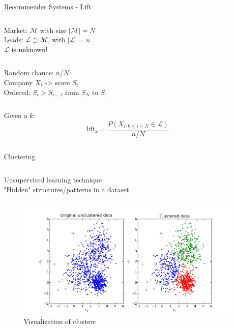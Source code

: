 \begin{frame}{Recommender Systems - Lift} \pause
    \begin{column}{.5\textwidth}
        Market: $\mathcal M$ with size $|\mathcal M |\!=\!N$ \\ \pause
        \vspace{0.25cm}
        Leads: $\mathcal L \supset \mathcal M $, with $|\mathcal L|\!=\!n$ \\ \pause
        \vspace{0.25cm}
        $\mathcal L$ is unknown! \\ \pause
    \end{column}
    \begin{column}{.5\textwidth}
        Random chance: $n/N$ \\ \pause
        \vspace{0.25cm}
        Company $X_i$ -> score $S_i$ \\ \pause
        \vspace{0.25cm}
        Ordered: $S_i>S_{i-1}$ from $S_N$ to $S_1$ \\ \pause
    \end{column}
    \vfill
    \begin{column}{\textwidth}
        Given a $k$: \pause
        \vspace{0.25cm}
        \LARGE{
            \begin{equation*}
                \mathrm{lift}_k = \frac{P(X_{i:k\leq i\leq N}\in \mathcal L)}{n/N}
            \end{equation*}
        }
    \end{column}
\end{frame}


\begin{frame}{Clustering} \pause
    \vspace{0.2cm}
    \begin{column}{\linewidth}
        Unsupervised learning technique \\ \pause
        \vspace{0.2cm}
        "Hidden" structures/patterns in a dataset \\ \pause
    \end{column}
    \begin{column}{\linewidth}
        \begin{figure}
            \centering
            \caption{Visualization of clusters}
            \includegraphics[width=.8\linewidth]{fig/clustering-example.png}
        \end{figure}
    \end{column}
\end{frame}


